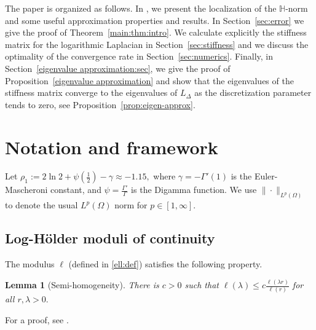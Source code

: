 \documentclass[11 pt]{article}
\newtheorem{lemma}[theorem]{Lemma}
\numberwithin{equation}{section}
\begin{document}
The paper is organized as follows. In , we present the localization of the $\mathbb{H}$-norm and some useful approximation properties and results. In Section~\ref{sec:error} we give the proof of Theorem~\ref{main:thm:intro}. We calculate explicitly the stiffness matrix for the logarithmic Laplacian in Section~\ref{sec:stiffness} and we discuss the optimality of the convergence rate in Section~\ref{sec:numerics}. Finally, in Section~\ref{eigenvalue approximation:sec}, we give the proof of Proposition~\ref{eigenvalue approximation} and show that the eigenvalues of the stiffness matrix converge to the eigenvalues of $L_{\Delta}$ as the discretization parameter tends to zero, see Proposition~\ref{prop:eigen-approx}.


\section{Notation and framework} \label{sec:notation}

Let $\rho_1:=2\ln 2 + \psi(\tfrac{1}{2})-\gamma\approx -1.15,$ where $\gamma=-\Gamma'(1)$ is the Euler-Mascheroni constant, and $\psi=\frac{\Gamma'}{\Gamma}$ is the Digamma function.  We use $\|\cdot\|_{L^p(\Omega)}$ to denote the usual $L^p(\Omega)$ norm for $p\in[1,\infty]$.

\subsection{Log-Hölder moduli of continuity}

The modulus $\ell$ (defined in \eqref{ell:def}) satisfies the following property.

\begin{lemma}[Semi-homogeneity]\label{prop1}
There is $c>0$ such that $\ell(\lambda)\leq c\frac{\ell(\lambda r)}{\ell(r)}$ for all $r,\lambda >0.$
\end{lemma}
For a proof, see \cite[Lemma 3.2]{CS22}.
\end{document}
